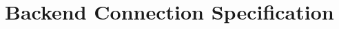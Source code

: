 \documentclass[a4paper, 12pt, titlepage, headsepline, listof = totoc, bibliography = totoc, numbers = noenddot]{scrbook} %
\begin{document}
\chapter{Backend Connection Specification} \label{chp:appendix:backend-ws-spec}
%



\setcounter{secnumdepth}{0}





%
%

\end{document}
